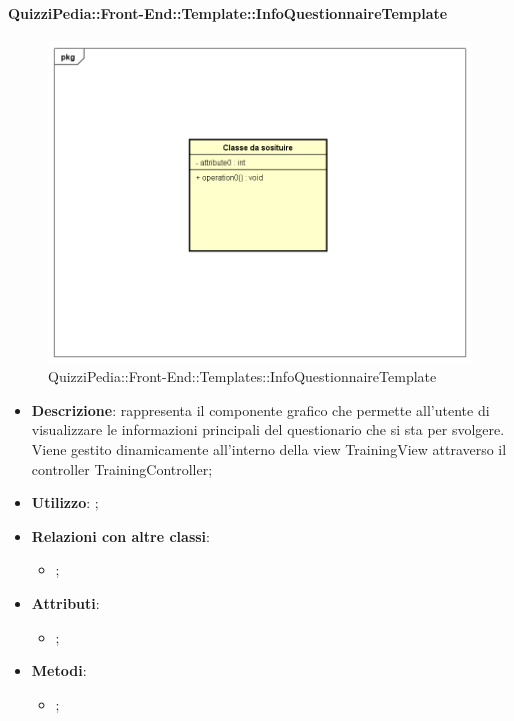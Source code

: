 		\paragraph{QuizziPedia::Front-End::Template::InfoQuestionnaireTemplate}
		
		\label{QuizziPedia::Front-End::Templates::InfoQuestionnaireTemplate}

		\begin{figure}[h]
			\centering
			\includegraphics[scale=0.5,keepaspectratio]{UML/Classi/Front-End/Temporanea.png}
			\caption{QuizziPedia::Front-End::Templates::InfoQuestionnaireTemplate}
		\end{figure}
		
		\begin{itemize}
			\item \textbf{Descrizione}: rappresenta il componente grafico che permette all'utente di visualizzare le informazioni principali del questionario che si sta per svolgere. Viene gestito dinamicamente all'interno della view TrainingView attraverso il controller TrainingController;
			\item \textbf{Utilizzo}: ;
			\item \textbf{Relazioni con altre classi}: 
			\begin{itemize}
				\item ;
			\end{itemize}
			\item \textbf{Attributi}: 
			\begin{itemize}
				\item ;
			\end{itemize}
			\item \textbf{Metodi}: 
			\begin{itemize}
				\item ;
			\end{itemize}
		\end{itemize}
																					